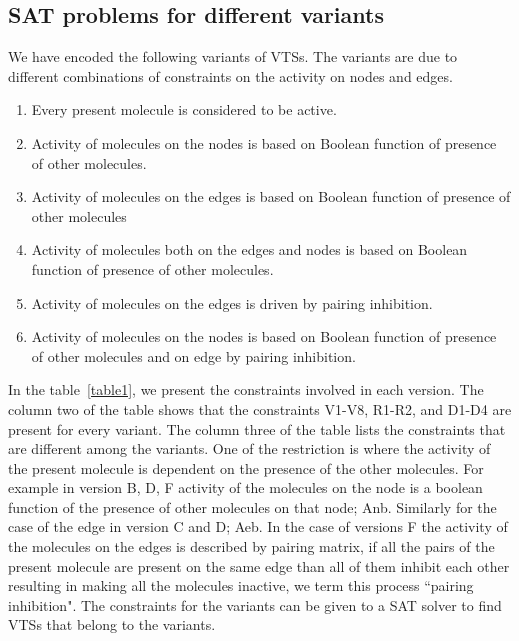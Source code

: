 
\subsection{SAT problems for different variants}

We have encoded the following variants of VTSs.
%
The variants are due to different combinations of constraints on the
activity on nodes and edges.
%
\begin{enumerate}[label=\Alph*]
\item Every present molecule is considered to be active.
\item Activity of molecules on the nodes is based on Boolean function of presence of other molecules. 
\item Activity of molecules on the edges is based on Boolean function of presence of other molecules
\item Activity of molecules both on the edges and nodes is based on Boolean function of presence of other molecules.
\item Activity of molecules on the edges is driven by pairing inhibition.
\item Activity of molecules on the nodes is based on Boolean function of presence of other molecules and on edge by pairing inhibition.
\end{enumerate}
%
%
In the table~\ref{table1}, we present the constraints involved in each version.
%
The column two of the table shows that the constraints V1-V8, R1-R2, and D1-D4 are present
for every variant.
%
The column three of the table lists the constraints that are different among the variants.
%
%
One of the restriction is where the activity of the present molecule is dependent on the presence of the other molecules.
%
For example in version B, D, F activity of the molecules on the node is a boolean function of the presence of other molecules on that node; Anb.
%
Similarly for the case of the edge in version C and D; Aeb.
%
In the case of versions F the activity of the molecules on the edges
is described by pairing matrix, if all the pairs of the present
molecule are present on the same edge than all of them inhibit each
other resulting in making all the molecules inactive, we term this
process ``pairing inhibition".
%
The constraints for the variants can be given to a SAT solver to find
VTSs that belong to the variants.


